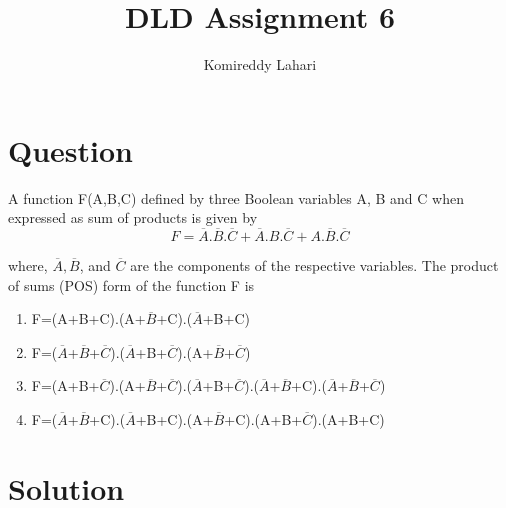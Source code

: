 \documentclass{article}
\title{DLD Assignment 6}
\author{Komireddy Lahari}
\begin{document}
\maketitle

\section{Question}
A function F(A,B,C) defined by three Boolean variables A, B and C when expressed as sum of products is given by
\begin{equation}
    F=\overline{A}.\overline{B}.\overline{C}+\overline{A}.B.\overline{C}+A.\overline{B}.\overline{C}
\end{equation}

where, $\overline{A},\overline{B}$, and $\overline{C}$ are the components of the respective variables. The product of sums (POS) form of the function F is

\begin{enumerate}[label=(\Alph*)]
    \item F=(A+B+C).(A+$\overline{B}$+C).($\overline{A}$+B+C)
    \item F=($\overline{A}$+$\overline{B}$+$\overline{C}$).($\overline{A}$+B+$\overline{C}$).(A+$\overline{B}$+$\overline{C}$)
    \item F=(A+B+$\overline{C}$).(A+$\overline{B}$+$\overline{C}$).($\overline{A}$+B+$\overline{C}$).($\overline{A}$+$\overline{B}$+C).($\overline{A}$+$\overline{B}$+$\overline{C}$)
    \item F=($\overline{A}$+$\overline{B}$+C).($\overline{A}$+B+C).(A+$\overline{B}$+C).(A+B+$\overline{C}$).(A+B+C)
\end{enumerate}

\section{Solution}
\end{document}
